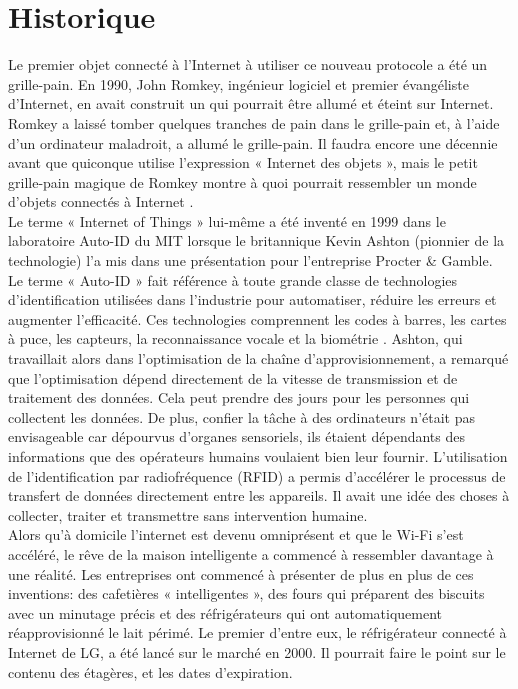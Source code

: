 		
	\section{Historique}
	Le premier \og objet \fg{}  connecté à l’Internet à utiliser ce nouveau protocole a été un grille-pain. En 1990, John Romkey, ingénieur logiciel et premier évangéliste d'Internet, en avait construit un qui pourrait être allumé et éteint sur Internet. Romkey a laissé tomber quelques tranches de pain dans le grille-pain et, à l'aide d'un ordinateur maladroit, a allumé le grille-pain. Il faudra encore une décennie avant que quiconque utilise l'expression « Internet des objets », mais le petit grille-pain magique de Romkey montre à quoi pourrait ressembler un monde d'objets connectés à Internet \cite{pardes2020iot}.\\
	 
	Le terme « Internet of Things » lui-même a été inventé en 1999 dans le laboratoire Auto-ID du MIT lorsque le britannique Kevin Ashton (pionnier de la technologie) l'a mis dans une présentation pour l’entreprise Procter \& Gamble. Le terme « Auto-ID » fait référence à toute grande classe de technologies d'identif{\kern0pt}ication utilisées dans l'industrie pour automatiser, réduire les erreurs et augmenter l'ef{\kern0pt}f{\kern0pt}icacité. Ces technologies comprennent les codes à barres, les cartes à puce, les capteurs, la reconnaissance vocale et la biométrie \cite{sundmaeker2010vision}. Ashton, qui travaillait alors dans l'optimisation de la chaîne d'approvisionnement, a remarqué que l'optimisation dépend directement de la vitesse de transmission et de traitement des données. Cela peut prendre des jours pour les personnes qui collectent les données. De plus, conf{\kern0pt}ier la tâche à des ordinateurs n’était pas envisageable car dépourvus d’organes sensoriels, ils étaient dépendants des informations que des opérateurs humains voulaient bien leur fournir. L'utilisation de l'identif{\kern0pt}ication par radiofréquence (RFID) a permis d'accélérer le processus de transfert de données directement entre les appareils. Il avait une idée des choses à collecter, traiter et transmettre sans intervention humaine.\\

	Alors qu’à domicile l'internet est devenu omniprésent et que le Wi-Fi s'est accéléré, le rêve de la maison intelligente a commencé à ressembler davantage à une réalité. Les entreprises ont commencé à présenter de plus en plus de ces inventions: des cafetières « intelligentes », des fours qui préparent des biscuits avec un minutage précis et des réfrigérateurs qui ont automatiquement réapprovisionné le lait périmé. Le premier d'entre eux, le réfrigérateur connecté à Internet de LG, a été lancé sur le marché en 2000. Il pourrait faire le point sur le contenu des étagères, et les dates d'expiration.

